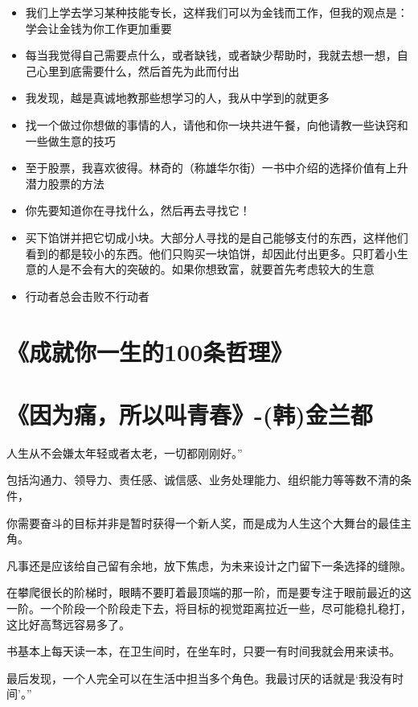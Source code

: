\documentclass[UTF8,a4paper,8pt]{ctexbook}
\begin{document}
\begin{itemize}
			\item 我们上学去学习某种技能专长，这样我们可以为金钱而工作，但我的观点是：学会让金钱为你工作更加重要
			\item 每当我觉得自己需要点什么，或者缺钱，或者缺少帮助时，我就去想一想，自己心里到底需要什么，然后首先为此而付出
			\item 我发现，越是真诚地教那些想学习的人，我从中学到的就更多
			\item 找一个做过你想做的事情的人，请他和你一块共进午餐，向他请教一些诀窍和一些做生意的技巧
			\item 至于股票，我喜欢彼得。林奇的（称雄华尔街）一书中介绍的选择价值有上升潜力股票的方法
			\item 你先要知道你在寻找什么，然后再去寻找它！
			\item 买下馅饼并把它切成小块。大部分人寻找的是自己能够支付的东西，这样他们看到的都是较小的东西。他们只购买一块馅饼，却因此付出更多。只盯着小生意的人是不会有大的突破的。如果你想致富，就要首先考虑较大的生意
			\item 行动者总会击败不行动者
		\end{itemize}
	
	\newpage
	\section{《成就你一生的100条哲理》 }
	
	\newpage
	\section{《因为痛，所以叫青春》-(韩)金兰都 }

		人生从不会嫌太年轻或者太老，一切都刚刚好。”
	
		
		包括沟通力、领导力、责任感、诚信感、业务处理能力、组织能力等等数不清的条件，
	
		
		你需要奋斗的目标并非是暂时获得一个新人奖，而是成为人生这个大舞台的最佳主角。
		
		
		凡事还是应该给自己留有余地，放下焦虑，为未来设计之门留下一条选择的缝隙。
	
		
		在攀爬很长的阶梯时，眼睛不要盯着最顶端的那一阶，而是要专注于眼前最近的这一阶。一个阶段一个阶段走下去，将目标的视觉距离拉近一些，尽可能稳扎稳打，这比好高骛远容易多了。
		
		
		书基本上每天读一本，在卫生间时，在坐车时，只要一有时间我就会用来读书。
	
		
		最后发现，一个人完全可以在生活中担当多个角色。我最讨厌的话就是‘我没有时间’。”
		
\end{document}
